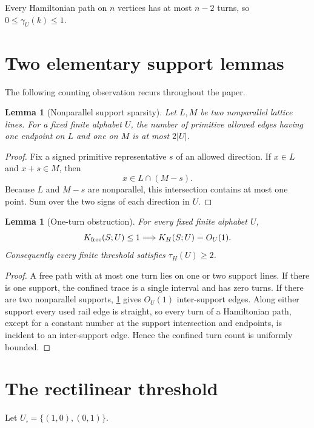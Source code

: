 \documentclass[11pt]{article}
\newtheorem{lemma}[theorem]{Lemma}
\theoremstyle{definition}
\begin{document}
Every Hamiltonian path on $n$ vertices has at most $n-2$ turns, so $0\le\gamma_U(k)\le1$.

\section{Two elementary support lemmas}\label{sec:support}
The following counting observation recurs throughout the paper.

\begin{lemma}[Nonparallel support sparsity]\label{lem:support-sparsity}
Let $L,M$ be two nonparallel lattice lines.  For a fixed finite alphabet $U$, the number of primitive allowed edges having one endpoint on $L$ and one on $M$ is at most $2|U|$.
\end{lemma}
\begin{proof}
Fix a signed primitive representative $s$ of an allowed direction.  If $x\in L$ and $x+s\in M$, then
\[
x\in L\cap(M-s).
\]
Because $L$ and $M-s$ are nonparallel, this intersection contains at most one point.  Sum over the two signs of each direction in $U$.
\end{proof}

\begin{lemma}[One-turn obstruction]\label{lem:one-turn}
For every fixed finite alphabet $U$,
\[
K_{\rm free}(S;U)\le1\Longrightarrow K_H(S;U)=O_U(1).
\]
Consequently every finite threshold satisfies $\tau_H(U)\ge2$.
\end{lemma}
\begin{proof}
A free path with at most one turn lies on one or two support lines.  If there is one support, the confined trace is a single interval and has zero turns.  If there are two nonparallel supports, \cref{lem:support-sparsity} gives $O_U(1)$ inter-support edges.  Along either support every used rail edge is straight, so every turn of a Hamiltonian path, except for a constant number at the support intersection and endpoints, is incident to an inter-support edge.  Hence the confined turn count is uniformly bounded.
\end{proof}

\section{The rectilinear threshold}\label{sec:rect}
Let $U_\square=\{(1,0),(0,1)\}$.
\end{document}
